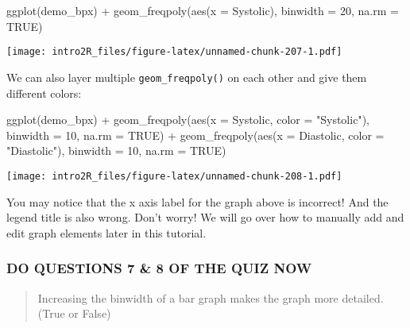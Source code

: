 \documentclass[
]{book}
\newenvironment{Shaded}{\begin{snugshade}}{\end{snugshade}}
\newcommand{\AttributeTok}[1]{\textcolor[rgb]{0.77,0.63,0.00}{#1}}
\newcommand{\ConstantTok}[1]{\textcolor[rgb]{0.00,0.00,0.00}{#1}}
\newcommand{\DecValTok}[1]{\textcolor[rgb]{0.00,0.00,0.81}{#1}}
\newcommand{\FunctionTok}[1]{\textcolor[rgb]{0.00,0.00,0.00}{#1}}
\newcommand{\NormalTok}[1]{#1}
\newcommand{\SpecialCharTok}[1]{\textcolor[rgb]{0.00,0.00,0.00}{#1}}
\newcommand{\StringTok}[1]{\textcolor[rgb]{0.31,0.60,0.02}{#1}}
\begin{document}
\begin{Shaded}
\begin{Highlighting}[]
\FunctionTok{ggplot}\NormalTok{(demo\_bpx) }\SpecialCharTok{+} 
    \FunctionTok{geom\_freqpoly}\NormalTok{(}\FunctionTok{aes}\NormalTok{(}\AttributeTok{x =}\NormalTok{ Systolic), }\AttributeTok{binwidth =} \DecValTok{20}\NormalTok{, }\AttributeTok{na.rm =} \ConstantTok{TRUE}\NormalTok{)}
\end{Highlighting}
\end{Shaded}

\texttt{[image: intro2R\_files/figure-latex/unnamed-chunk-207-1.pdf]}

We can also layer multiple \texttt{geom\_freqpoly()} on each other and give them different colors:

\begin{Shaded}
\begin{Highlighting}[]
\FunctionTok{ggplot}\NormalTok{(demo\_bpx) }\SpecialCharTok{+} 
    \FunctionTok{geom\_freqpoly}\NormalTok{(}\FunctionTok{aes}\NormalTok{(}\AttributeTok{x =}\NormalTok{ Systolic, }\AttributeTok{color =} \StringTok{"Systolic"}\NormalTok{), }\AttributeTok{binwidth =} \DecValTok{10}\NormalTok{, }\AttributeTok{na.rm =} \ConstantTok{TRUE}\NormalTok{) }\SpecialCharTok{+}
    \FunctionTok{geom\_freqpoly}\NormalTok{(}\FunctionTok{aes}\NormalTok{(}\AttributeTok{x =}\NormalTok{ Diastolic, }\AttributeTok{color =} \StringTok{"Diastolic"}\NormalTok{), }\AttributeTok{binwidth =} \DecValTok{10}\NormalTok{, }\AttributeTok{na.rm =} \ConstantTok{TRUE}\NormalTok{)}
\end{Highlighting}
\end{Shaded}

\texttt{[image: intro2R\_files/figure-latex/unnamed-chunk-208-1.pdf]}

You may notice that the x axis label for the graph above is incorrect! And the legend title is also wrong. Don't worry! We will go over how to manually add and edit graph elements later in this tutorial.

\hypertarget{do-questions-7-8-of-the-quiz-now}{%
\subsubsection{DO QUESTIONS 7 \& 8 OF THE QUIZ NOW}\label{do-questions-7-8-of-the-quiz-now}}

\begin{quote}
Increasing the binwidth of a bar graph makes the graph more detailed. (True or False)
\end{quote}
\end{document}
